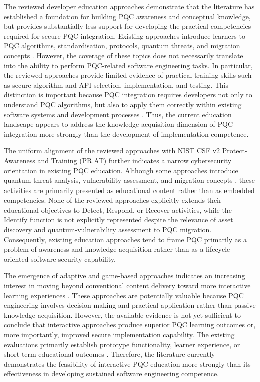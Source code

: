 \documentclass[letterpaper,twocolumn,10pt]{article}
\begin{document}
The reviewed developer education approaches demonstrate that the literature has established a foundation for building PQC awareness and conceptual knowledge, but provides substantially less support for developing the practical competencies required for secure PQC integration. Existing approaches introduce learners to PQC algorithms, standardisation, protocols, quantum threats, and migration concepts \cite{Ana_borrelli_designing_2024, Ana_borrelli_towards_2025, Ana_edComScSociety, Ana_PQCIP, Ana_EducModule}. However, the coverage of these topics does not necessarily translate into the ability to perform PQC-related software engineering tasks. In particular, the reviewed approaches provide limited evidence of practical training skills such as secure algorithm and API selection, implementation, and testing. This distinction is important because PQC integration requires developers not only to understand PQC algorithms, but also to apply them correctly within existing software systems and development processes \cite{anonymous_pqc_sok_2026}. Thus, the current education landscape appears to address the knowledge acquisition dimension of PQC integration more strongly than the development of implementation competence.

The uniform alignment of the reviewed approaches with NIST CSF v2 Protect-Awareness and Training (PR.AT) further indicates a narrow cybersecurity orientation in existing PQC education. Although some approaches introduce quantum threat analysis, vulnerability assessment, and migration concepts \cite{Ana_edComScSociety, Ana_PQCIP}, these activities are primarily presented as educational content rather than as embedded competencies. None of the reviewed approaches explicitly extends their educational objectives to Detect, Respond, or Recover activities, while the Identify function is not explicitly represented despite the relevance of asset discovery and quantum-vulnerability assessment to PQC migration. Consequently, existing education approaches tend to frame PQC primarily as a problem of awareness and knowledge acquisition rather than as a lifecycle-oriented software security capability. 

The emergence of adaptive and game-based approaches indicates an increasing interest in moving beyond conventional content delivery toward more interactive learning experiences \cite{Ana_PQCLabEdu, Ana_abdelhamid_wip_2024}. These approaches are potentially valuable because PQC engineering involves decision-making and practical application rather than passive knowledge acquisition. However, the available evidence is not yet sufficient to conclude that interactive approaches produce superior PQC learning outcomes or, more importantly, improved secure implementation capability. The existing evaluations primarily establish prototype functionality, learner experience, or short-term educational outcomes \cite{Ana_PQCLabEdu, Ana_abdelhamid_wip_2024}. Therefore, the literature currently demonstrates the feasibility of interactive PQC education more strongly than its effectiveness in developing sustained software engineering competence.
\end{document}
